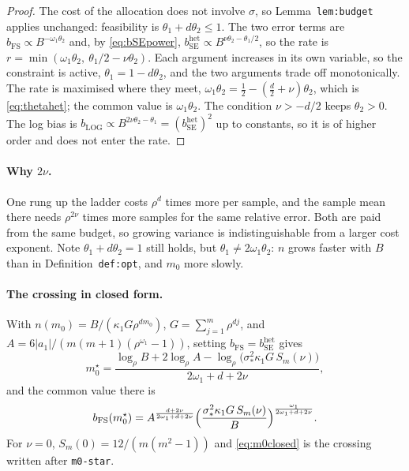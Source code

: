 \documentclass[11pt]{article}
\newcommand{\bSE}{b_{\mathrm{SE}}}
\newcommand{\bFS}{b_{\mathrm{FS}}}
\newcommand{\bLOG}{b_{\mathrm{LOG}}}
\begin{document}
\begin{proof}
The cost of the allocation does not involve $\sigma$, so Lemma~\texttt{lem:budget}
applies unchanged: feasibility is $\theta_1+d\theta_2\le1$. The two error
terms are $\bFS\propto B^{-\omega_1\theta_2}$ and, by \eqref{eq:bSEpower},
$\bSE^{\mathrm{het}}\propto B^{\nu\theta_2-\theta_1/2}$, so the rate is
$r=\min(\omega_1\theta_2,\ \theta_1/2-\nu\theta_2)$. Each argument increases
in its own variable, so the constraint is active, $\theta_1=1-d\theta_2$, and
the two arguments trade off monotonically. The rate is maximised where they
meet, $\omega_1\theta_2=\tfrac12-(\tfrac d2+\nu)\theta_2$, which is
\eqref{eq:thetahet}; the common value is $\omega_1\theta_2$. The condition
$\nu>-d/2$ keeps $\theta_2>0$. The log bias is $\bLOG\propto
B^{2\nu\theta_2-\theta_1}=(\bSE^{\mathrm{het}})^2$ up to constants, so it is of
higher order and does not enter the rate.
\end{proof}

\paragraph{Why $2\nu$.} One rung up the ladder costs $\rho^d$ times more per
sample, and the sample mean there needs $\rho^{2\nu}$ times more samples for the
same relative error. Both are paid from the same budget, so growing variance is
indistinguishable from a larger cost exponent. Note $\theta_1+d\theta_2=1$
still holds, but $\theta_1\ne2\omega_1\theta_2$: $n$ grows faster with $B$
than in Definition~\texttt{def:opt}, and $m_0$ more slowly.

\paragraph{The crossing in closed form.} With
$n(m_0)=B/(\kappa_1G\rho^{dm_0})$, $G=\sum_{j=1}^m\rho^{dj}$, and
$A=6|a_1|/(m(m+1)(\rho^{\omega_1}-1))$, setting $\bFS=\bSE^{\mathrm{het}}$
gives
\begin{equation}
  m_0^\star=\frac{\log_\rho B+2\log_\rho A-\log_\rho\bigl(\sigma_*^2\kappa_1G\,S_m(\nu)\bigr)}
                 {2\omega_1+d+2\nu},
  \label{eq:m0closed}
\end{equation}
and the common value there is
\[
  \bFS(m_0^\star)=A^{\frac{d+2\nu}{2\omega_1+d+2\nu}}
  \Bigl(\frac{\sigma_*^2\kappa_1G\,S_m(\nu)}{B}\Bigr)^{\frac{\omega_1}{2\omega_1+d+2\nu}}.
\]
For $\nu=0$, $S_m(0)=12/(m(m^2-1))$ and \eqref{eq:m0closed} is the crossing
written after \texttt{m0-star}.
\end{document}
